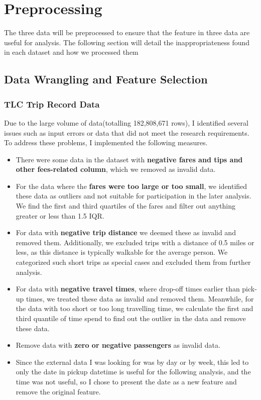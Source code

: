 \documentclass[11pt]{article}
\begin{document}
\section{Preprocessing}

The three data will be preprocessed to ensure that the feature in three data are useful for analysis. The following section will detail the inappropriateness
 found in each dataset and how we processed them

\subsection{Data Wrangling and Feature Selection}
\subsubsection{TLC Trip Record Data}

Due to the large volume of data(totalling 182,808,671 rows), I identified several issues such as input errors or data that did not meet the research requirements. To address these problems, 
I implemented the following measures.

\begin{itemize}
    \item There were some data in the dataset with \textbf{negative fares and tips and other fees-related column}, which we removed as invalid data. 
    \item For the data where the \textbf{fares were too large or too small}, we identified these data as outliers and not suitable for participation in the later analysis. We find the first and third 
    quartiles of the fares and filter out anything greater or less than 1.5 \*IQR.
    \item For data with \textbf{negative trip distance} we deemed these as invalid and removed them. Additionally, we excluded trips with a distance of 0.5 miles or less, as this distance is typically 
    walkable for the average person. We categorized such short trips as special cases and excluded them from further analysis.
    \item For data with \textbf{negative travel times}, where drop-off times earlier than pick-up times, we treated these data as invalid and removed them. Meanwhile, for the data with too short or too 
    long travelling time, we calculate the first and third quantile of time spend to find out the outlier in the data and remove these data.
    \item Remove data with \textbf{zero or negative passengers} as invalid data.
    \item Since the external data I was looking for was by day or by week, this led to only the date in pickup datetime is useful for the following analysis, and the time was not useful, so I chose to 
    present the date as a new feature and remove the original feature.
\end{itemize}
\end{document}
